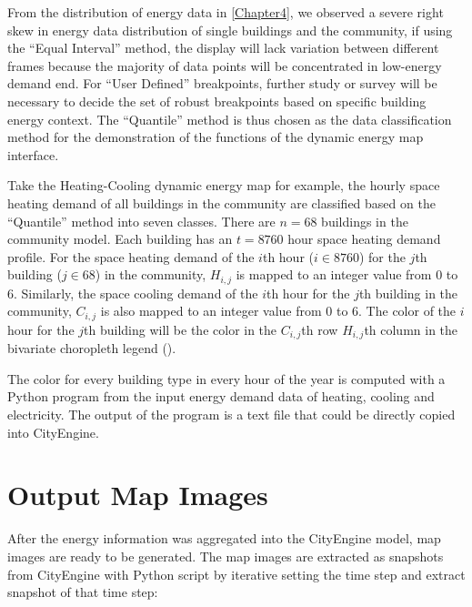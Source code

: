 From the distribution of energy data in \cref{Chapter4}, we observed a
severe right skew in energy data distribution of single buildings and
the community, if using the ``Equal Interval'' method, the display
will lack variation between different frames because the majority of
data points will be concentrated in low-energy demand end. For ``User
Defined'' breakpoints, further study or survey will be necessary to
decide the set of robust breakpoints based on specific building energy
context. The ``Quantile'' method is thus chosen as the data
classification method for the demonstration of the functions of the
dynamic energy map interface.

Take the Heating-Cooling dynamic energy map for example, the hourly
space heating demand of all buildings in the community are classified
based on the ``Quantile'' method into seven classes. There are
$n = 68$ buildings in the community model. Each building has an
$t = 8760$ hour space heating demand profile. For the space heating
demand of the $i$th hour ($i \in 8760$) for the $j$th building
($j \in 68$) in the community, $H_{i, j}$ is mapped to an integer
value from 0 to 6. Similarly, the space cooling demand of the $i$th
hour for the $j$th building in the community, $C_{i, j}$ is also
mapped to an integer value from 0 to 6. The color of the $i$hour for
the $j$th building will be the color in the $C_{i, j}$th row
$H_{i, j}$th column in the bivariate choropleth legend
().

The color for every building type in every hour of the year is
computed with a Python program from the input energy demand data of
heating, cooling and electricity. The output of the program is a text
file that could be directly copied into CityEngine.

\section{Output Map Images}
After the energy information was aggregated into the CityEngine model,
map images are ready to be generated. The map images are extracted as
snapshots from CityEngine with Python script by iterative setting the
time step and extract snapshot of that time step:

